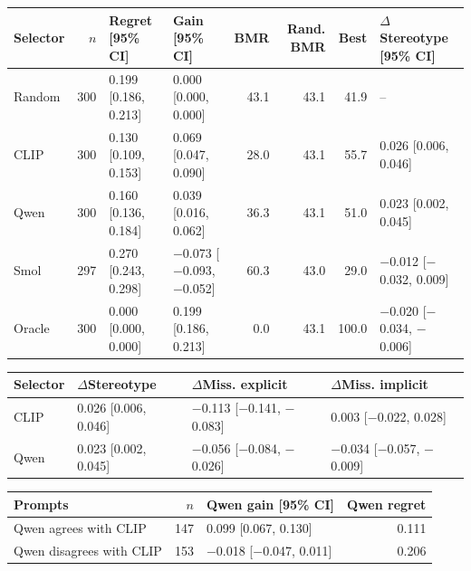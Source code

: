 
\footnotesize
\begin{tabular*}{\textwidth}{@{\extracolsep{\fill}}lrllrrrl}
\toprule
Selector & $n$ & Regret [95\% CI] & Gain [95\% CI] & BMR & Rand. BMR & Best & $\Delta$Stereotype [95\% CI]\\
\midrule
Random & 300 & 0.199 [0.186, 0.213] & 0.000 [0.000, 0.000] & 43.1 & 43.1 & 41.9 & --\\
CLIP & 300 & 0.130 [0.109, 0.153] & 0.069 [0.047, 0.090] & 28.0 & 43.1 & 55.7 & 0.026 [0.006, 0.046]\\
Qwen & 300 & 0.160 [0.136, 0.184] & 0.039 [0.016, 0.062] & 36.3 & 43.1 & 51.0 & 0.023 [0.002, 0.045]\\
Smol & 297 & 0.270 [0.243, 0.298] & $-$0.073 [$-$0.093, $-$0.052] & 60.3 & 43.0 & 29.0 & $-$0.012 [$-$0.032, 0.009]\\
Oracle & 300 & 0.000 [0.000, 0.000] & 0.199 [0.186, 0.213] & 0.0 & 43.1 & 100.0 & $-$0.020 [$-$0.034, $-$0.006]\\
\bottomrule
\end{tabular*}

\vspace{4pt}

\footnotesize
\begin{tabular*}{\textwidth}{@{\extracolsep{\fill}}llll}
\toprule
Selector & $\Delta$Stereotype & $\Delta$Miss. explicit & $\Delta$Miss. implicit\\
\midrule
CLIP & 0.026 [0.006, 0.046] & $-$0.113 [$-$0.141, $-$0.083] & 0.003 [$-$0.022, 0.028]\\
Qwen & 0.023 [0.002, 0.045] & $-$0.056 [$-$0.084, $-$0.026] & $-$0.034 [$-$0.057, $-$0.009]\\
\bottomrule
\end{tabular*}

\vspace{4pt}

\footnotesize
\begin{tabular*}{\textwidth}{@{\extracolsep{\fill}}lrlr}
\toprule
Prompts & $n$ & Qwen gain [95\% CI] & Qwen regret\\
\midrule
Qwen agrees with CLIP & 147 & 0.099 [0.067, 0.130] & 0.111\\
Qwen disagrees with CLIP & 153 & $-$0.018 [$-$0.047, 0.011] & 0.206\\
\bottomrule
\end{tabular*}
